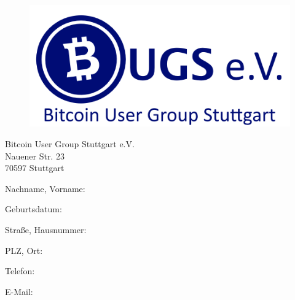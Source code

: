 \documentclass[ngerman]{scrartcl}
\begin{document}
\begin{figure}
    \includegraphics[width=.4\textwidth, right]{Logo}
\end{figure}
\vspace*{8ex}
\noindent
Bitcoin User Group Stuttgart e.V.\\
Nauener Str. 23\\
70597 Stuttgart\\


\vspace{6ex}

\noindent{}

\vspace{6ex}

Nachname, Vorname:\hspace{2ex}\uline{
\phantom{xxxxxxxxxxxxxxxxxxx}
\hfill\phantom{x}}

\vspace{4ex}

Geburtsdatum:\hspace{2ex}\uline{
\phantom{xxxxxxxxxxxxxxxxxxx}
\hfill\phantom{x}}

\vspace{4ex}

Stra\ss{}e, Hausnummer:\hspace{2ex}\uline{
\phantom{xxxxxxxxxxxxxxxxxxx}
\hfill\phantom{x}}

\vspace{4ex}

PLZ, Ort:\hspace{2ex}\uline{
\phantom{xxxxxxxxxxxxxxxxxxx}
\hfill\phantom{x}}

\vspace{4ex}

Telefon:\hspace{2ex}\uline{
\phantom{xxxxxxxxxxxxxxxxxxx}
\hfill\phantom{x}}

\vspace{4ex}

E-Mail:\hspace{2ex}\uline{
\phantom{xxxxxxxxxxxxxxxxxxx}
\hfill\phantom{x}}

\vspace{4ex}
\end{document}

